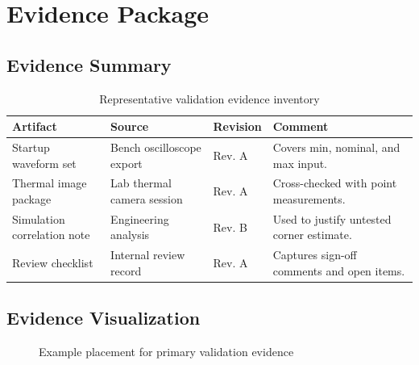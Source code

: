 \section{Evidence Package}

\subsection{Evidence Summary}
\begin{table}[H]
    \centering
    \small
    \begin{tabular}{p{2.8cm} p{2.8cm} p{2.3cm} p{3.5cm}}
        \toprule
        \textbf{Artifact} & \textbf{Source} & \textbf{Revision} & \textbf{Comment} \\
        \midrule
        Startup waveform set & Bench oscilloscope export & Rev. A & Covers min, nominal, and max input. \\
        Thermal image package & Lab thermal camera session & Rev. A & Cross-checked with point measurements. \\
        Simulation correlation note & Engineering analysis & Rev. B & Used to justify untested corner estimate. \\
        Review checklist & Internal review record & Rev. A & Captures sign-off comments and open items. \\
        \bottomrule
    \end{tabular}
    \caption{Representative validation evidence inventory}
    \label{tab:evidence-inventory}
\end{table}

\subsection{Evidence Visualization}
\begin{figure}[H]
    \centering
    \caption{Example placement for primary validation evidence}
    \label{fig:validation-evidence}
\end{figure}

